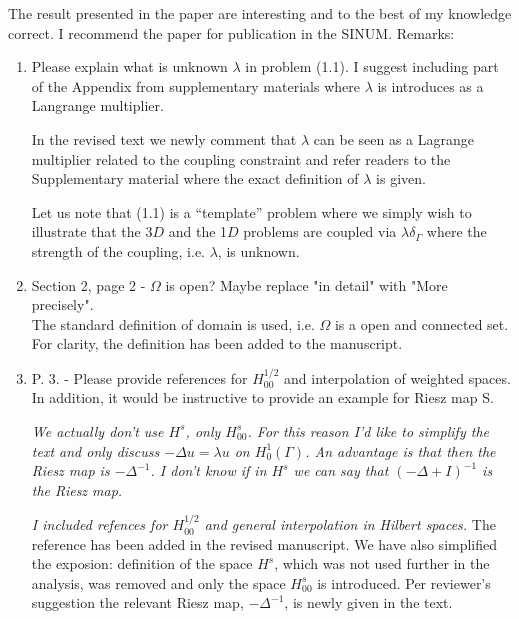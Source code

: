 \documentclass{article}
\newcommand{\fede}[1]{{\color{green!55!blue}#1}}
\newcommand{\miro}[1]{{\color{blue}#1}}
\begin{document}
The result presented in the paper are interesting and to the best of my knowledge correct. I recommend the paper for publication in the SINUM.
Remarks:
\begin{enumerate}
\item Please explain what is unknown $\lambda$ in problem (1.1). I suggest including part of the Appendix from supplementary materials where $\lambda$ is introduces as a Langrange multiplier.
  \miro{
    In the revised text we newly comment that $\lambda$ can be seen as a Lagrange multiplier related to
    the coupling constraint and refer readers to the Supplementary material where the exact definition of
    $\lambda$ is given.

    Let us note that (1.1) is a ``template'' problem where we simply wish to illustrate
    that the 3$D$ and the 1$D$ problems are coupled via $\lambda\delta_{\Gamma}$ where the strength
    of the coupling, i.e. $\lambda$, is unknown. 
    }
    \item Section 2, page 2 - $\Omega$ is open? Maybe replace "in detail" with "More precisely".\\
    \fede{The standard definition of domain is used, i.e. $\Omega$ is a open and connected set. For clarity, the definition has been added to the manuscript. }
  \item P. 3. - Please provide references for $H^{1/2}_{00}$ and interpolation of weighted spaces. In addition, it would be instructive to provide an example for Riesz map S.
    \miro{
      \textit{We actually don't use $H^s$, only $H^s_{00}$. For this reason I'd like to
      simplify the text and only discuss $-\Delta u=\lambda u$ on $H^1_0(\Gamma)$.
      An advantage is that then the Riesz map is $-\Delta^{-1}$. I don't know if
      in $H^s$ we can say that $(-\Delta+I)^{-1}$ is the Riesz map.}

      \textit{
        I included refences for $H^{1/2}_{00}$ and general interpolation in
        Hilbert spaces.
      }
      The reference has been added in the revised manuscript. We have
      also simplified the exposion: definition of the space $H^s$,
      which was not used further in the analysis, was removed and only
      the space $H^s_{00}$ is introduced. Per reviewer's suggestion the
      relevant Riesz map, $-\Delta^{-1}$, is newly given in the text.
      }
    

\end{enumerate}
\end{document}
